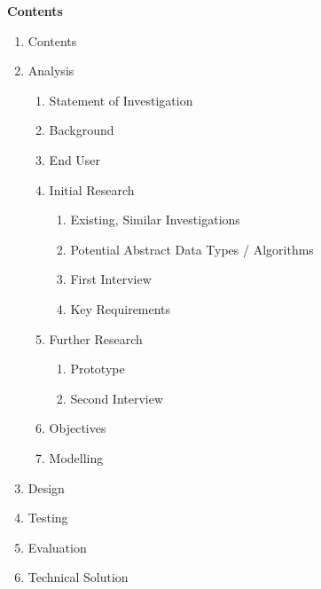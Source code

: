 \documentclass{article}
\begin{document}
\begin{flushleft}
    \huge
    \textbf{Contents}
    
    \Large
    \begin{enumerate}
        \item Contents
        \item Analysis
            \begin{enumerate}
                \item Statement of Investigation
                \item Background
                \item End User
                \item Initial Research
                    \begin{enumerate}
                        \item Existing, Similar Investigations
                        \item Potential Abstract Data Types / Algorithms
                        \item First Interview
                        \item Key Requirements
                    \end{enumerate}
                \item Further Research
                    \begin{enumerate}
                        \item Prototype
                        \item Second Interview
                    \end{enumerate}
                \item Objectives
                \item Modelling
            \end{enumerate}
        \item Design
        \item Testing
        \item Evaluation
        \item Technical Solution
    \end{enumerate}
    
    \pagebreak
\end{flushleft}








\end{document}
